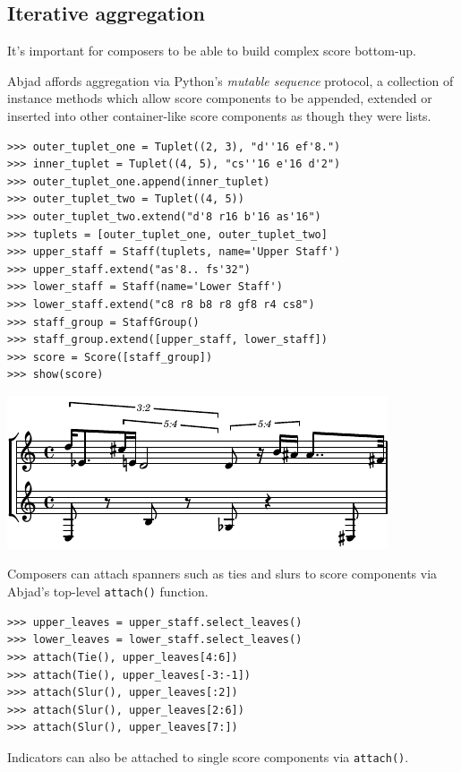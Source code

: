 \documentclass{article}
\begin{document}
\subsection{Iterative aggregation}

It's important for composers to be able to build complex score bottom-up.

Abjad affords aggregation via Python's \emph{mutable sequence} protocol, a
collection of instance methods which allow score components to be appended,
extended or inserted into other container-like score components as though they
were lists.

\begin{lstlisting}
>>> outer_tuplet_one = Tuplet((2, 3), "d''16 ef'8.")
>>> inner_tuplet = Tuplet((4, 5), "cs''16 e'16 d'2")
>>> outer_tuplet_one.append(inner_tuplet)
>>> outer_tuplet_two = Tuplet((4, 5))
>>> outer_tuplet_two.extend("d'8 r16 b'16 as'16")
>>> tuplets = [outer_tuplet_one, outer_tuplet_two]
>>> upper_staff = Staff(tuplets, name='Upper Staff')
>>> upper_staff.extend("as'8.. fs'32")
>>> lower_staff = Staff(name='Lower Staff')
>>> lower_staff.extend("c8 r8 b8 r8 gf8 r4 cs8")
>>> staff_group = StaffGroup()
>>> staff_group.extend([upper_staff, lower_staff])
>>> score = Score([staff_group])
>>> show(score)
\end{lstlisting}

\noindent\includegraphics[scale=1.0]{images/abjad-1.pdf}


Composers can attach spanners such as ties and slurs to score components via
Abjad's top-level \texttt{attach()} function.

\begin{lstlisting}
>>> upper_leaves = upper_staff.select_leaves()
>>> lower_leaves = lower_staff.select_leaves()
>>> attach(Tie(), upper_leaves[4:6])
>>> attach(Tie(), upper_leaves[-3:-1])
>>> attach(Slur(), upper_leaves[:2])
>>> attach(Slur(), upper_leaves[2:6])
>>> attach(Slur(), upper_leaves[7:])
\end{lstlisting}


Indicators can also be attached to single score components via
\texttt{attach()}.
\end{document}

